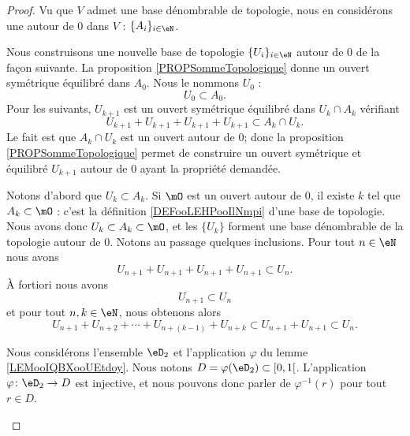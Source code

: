 \begin{proof}
	Vu que \( V\) admet une base dénombrable de topologie, nous en considérons une autour de \( 0\) dans \( V\) : \( \{ A_i \}_{i\in \eN}\).

	\begin{subproof}
		Nous construisons une nouvelle base de topologie \( \{ U_i \}_{i\in \eN}\) autour de \( 0\) de la façon suivante. La proposition \ref{PROPSommeTopologique} donne un ouvert symétrique équilibré dans \( A_0\). Nous le nommons \( U_0\) :
		\begin{equation}
			U_0\subset A_0.
		\end{equation}
		Pour les suivants, \( U_{k+1}\) est un ouvert symétrique équilibré dans \( U_{k}\cap A_k\) vérifiant
		\begin{equation}
			U_{k+1}+U_{k+1}+U_{k+1}+U_{k+1}\subset A_k\cap U_{k}.       \label{EQooECMVooLllLhu}
		\end{equation}
		Le fait est que \( A_k\cap U_k\) est un ouvert autour de \( 0\); donc la proposition \ref{PROPSommeTopologique} permet de construire un ouvert symétrique et équilibré \( U_{k+1}\) autour de \( 0\) ayant la propriété demandée.

		Notons d'abord que \( U_k\subset A_k\). Si \( \mO\) est un ouvert autour de \( 0\), il existe \( k\) tel que \( A_k\subset \mO\) : c'est la définition \ref{DEFooLEHPooIlNmpi} d'une base de topologie. Nous avons donc \( U_k\subset A_k\subset \mO\), et les \( \{ U_k \}\) forment une base dénombrable de la topologie autour de \( 0\).
		Notons au passage quelques inclusions. Pour tout \( n\in \eN\) nous avons
		\begin{equation}    \label{EqBaseTopoMetriquePf1}
			U_{n+1} + U_{n+1} + U_{n+1} + U_{n+1} \subset U_n.
		\end{equation}
		À fortiori nous avons
		\begin{equation}        \label{EQooARBRooOiAVhH}
			U_{n+1}\subset U_n
		\end{equation}
		et pour tout \( n,k\in \eN\), nous obtenons alors
		\begin{equation}\label{EqBaseTopoMetriquePf2}
			U_{n+1} + U_{n+2} + \cdots  + U_{n+(k-1)} + U_{n+k} \subset  U_{n+1} + U_{n+1} \subset U_n.
		\end{equation}

		\spitem[L'ensemble \( D\)]
		Nous considérons l'ensemble \( \eD_2\) et l'application \( \varphi\) du lemme \ref{LEMooIQBXooUEtdoy}. Nous notons \( D=\varphi(\eD_2)\subset\mathopen[ 0 , 1 \mathclose[\). L'application \( \varphi\colon \eD_2\to D\) est injective, et nous pouvons donc parler de \( \varphi^{-1}(r)\) pour tout \( r\in D\).


\end{subproof}
\end{proof}
